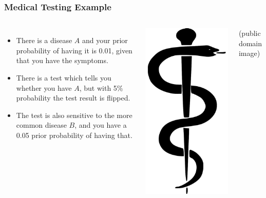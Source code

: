 \documentclass{beamer}
\begin{document}
\begin{frame}
\frametitle{Medical Testing Example}


    \begin{columns} %

        \begin{itemize}
        \item There is a disease $A$ and your prior
                probability of having it is 0.01,
                given that you have the symptoms.

        \item   There is a test which tells you
                whether you have $A$, but with 5\%
                probability the test result is flipped.

        \item The test is also sensitive to the
                more common disease $B$, and you
                have a 0.05 prior probability of
                having that.
        \end{itemize}

        \includegraphics[width=0.6\linewidth]{images/medicine.jpg}
       
         (public domain image)
     \end{columns}

\end{frame}
\end{document}
